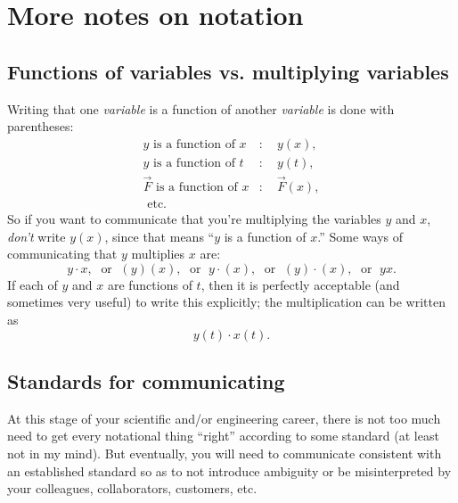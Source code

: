 \documentclass[10pt,letterpaper,twoside]{article}
\begin{document}
\section{More notes on notation}
\subsection{Functions of variables vs. multiplying variables}
Writing that one \textit{variable} is a function of another \textit{variable} is done with parentheses:
\begin{align*}
  y \text{ is a function of } x &:\quad y(x), \\
  y \text{ is a function of } t &:\quad y(t), \\
  \vec F \text{ is a function of } x &:\quad \vec F(x), \\
  \text{ etc.} 
\end{align*}
So if you want to communicate that you're multiplying the variables $y$ and $x$, \textit{don't} write $y(x)$, since that means ``$y$ is a function of $x$.''
Some ways of communicating that $y$ multiplies $x$ are:
$$ y\cdot x, \;\text{ or } \; (y)(x), \;\text{ or } \; y\cdot(x), \;\text{ or } \; (y)\cdot(x), \;\text{ or } \; yx.$$
If each of $y$ and $x$ are functions of $t$, then it is perfectly acceptable (and sometimes very useful) to write this explicitly; the multiplication can be written as
$$ y(t)\cdot x(t).$$


\subsection{Standards for communicating}
At this stage of your scientific and/or engineering career, there is not too much need to get every notational thing ``right'' according to some standard (at least not in my mind).
But eventually, you will need to communicate consistent with an established standard so as to not introduce ambiguity or be misinterpreted by your colleagues, collaborators, customers, etc.
\end{document}
